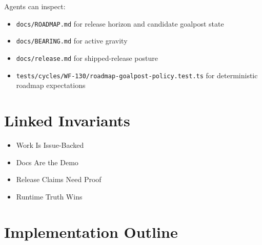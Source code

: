 Agents can inspect:

\begin{itemize}
\tightlist
\item
  \texttt{d\allowbreak{}o\allowbreak{}c\allowbreak{}s\allowbreak{}/\allowbreak{}R\allowbreak{}O\allowbreak{}A\allowbreak{}D\allowbreak{}M\allowbreak{}A\allowbreak{}P\allowbreak{}.\allowbreak{}m\allowbreak{}d} for release horizon and candidate goalpost state
\item
  \texttt{d\allowbreak{}o\allowbreak{}c\allowbreak{}s\allowbreak{}/\allowbreak{}B\allowbreak{}E\allowbreak{}A\allowbreak{}R\allowbreak{}I\allowbreak{}N\allowbreak{}G\allowbreak{}.\allowbreak{}m\allowbreak{}d} for active gravity
\item
  \texttt{d\allowbreak{}o\allowbreak{}c\allowbreak{}s\allowbreak{}/\allowbreak{}r\allowbreak{}e\allowbreak{}l\allowbreak{}e\allowbreak{}a\allowbreak{}s\allowbreak{}e\allowbreak{}.\allowbreak{}m\allowbreak{}d} for shipped-release posture
\item
  \texttt{t\allowbreak{}e\allowbreak{}s\allowbreak{}t\allowbreak{}s\allowbreak{}/\allowbreak{}c\allowbreak{}y\allowbreak{}c\allowbreak{}l\allowbreak{}e\allowbreak{}s\allowbreak{}/\allowbreak{}W\allowbreak{}F\allowbreak{}-\allowbreak{}1\allowbreak{}3\allowbreak{}0\allowbreak{}/\allowbreak{}r\allowbreak{}o\allowbreak{}a\allowbreak{}d\allowbreak{}m\allowbreak{}a\allowbreak{}p\allowbreak{}-\allowbreak{}g\allowbreak{}o\allowbreak{}a\allowbreak{}l\allowbreak{}p\allowbreak{}o\allowbreak{}s\allowbreak{}t\allowbreak{}-\allowbreak{}p\allowbreak{}o\allowbreak{}l\allowbreak{}i\allowbreak{}c\allowbreak{}y\allowbreak{}.\allowbreak{}t\allowbreak{}e\allowbreak{}s\allowbreak{}t\allowbreak{}.\allowbreak{}t\allowbreak{}s} for deterministic roadmap expectations
\end{itemize}

\section{Linked Invariants}\label{record-213-linked-invariants}

\begin{itemize}
\tightlist
\item
  Work Is Issue-Backed
\item
  Docs Are the Demo
\item
  Release Claims Need Proof
\item
  Runtime Truth Wins
\end{itemize}

\section{Implementation Outline}\label{record-213-implementation-outline}

